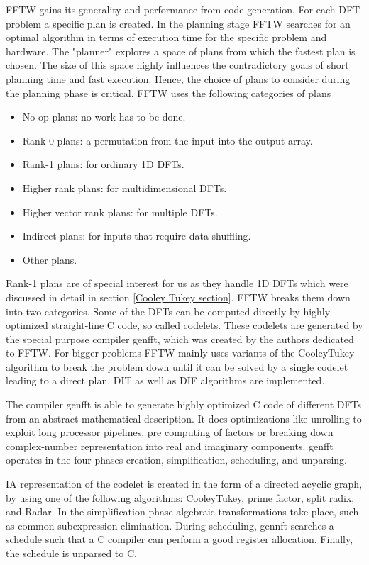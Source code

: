 \documentclass{usiinftr}
\begin{document}
FFTW gains its generality and performance from code generation.
For each DFT problem a specific plan is created.
In the planning stage FFTW searches for an optimal algorithm in terms of execution time for the specific problem and hardware.
The "planner" explores a space of plans from which the fastest plan is chosen.
The size of this space highly influences the contradictory goals of short planning time and fast execution.
Hence, the choice of plans to consider during the planning phase is critical.
FFTW uses the following categories of plans\cite{FFTW05}
\begin{itemize}
\item No-op plans: no work has to be done.
\item Rank-0 plans: a permutation from the input into the output array.
\item Rank-1 plans: for ordinary 1D DFTs.
\item Higher rank plans: for multidimensional DFTs.
\item Higher vector rank plans: for multiple DFTs.
\item Indirect plans: for inputs that require data shuffling.
\item Other plans.
\end{itemize}


Rank-1 plans are of special interest for us as they handle 1D DFTs which were discussed in detail in section \ref{Cooley Tukey section}.
FFTW breaks them down into two categories.
Some of the DFTs can be computed directly by highly optimized straight-line C code, so called codelets. 
These codelets are generated by the special purpose compiler genfft, which was created by the authors dedicated to FFTW.
For bigger problems FFTW mainly uses variants of the Cooley\textendash Tukey algorithm to break the problem down until it can be solved by a single codelet leading to a direct plan.
DIT as well as DIF algorithms are implemented.

The compiler genfft is able to generate highly optimized C code of different DFTs from an abstract mathematical description.
It does optimizations like unrolling to exploit long processor pipelines, pre computing of factors or breaking down complex-number representation into real and imaginary components.
genfft operates in the four phases creation, simplification, scheduling, and unparsing.

IA representation of the codelet is created in the form of a directed acyclic graph, by using one of the following algorithms: Cooley\textendash Tukey, prime factor, split radix, and Radar.
In the simplification phase algebraic transformations take place, such as common subexpression elimination.
During scheduling, gennft searches a schedule such that a C compiler can perform a good register allocation.
Finally, the schedule is unparsed to C\cite{FFTW05}.
\end{document}
